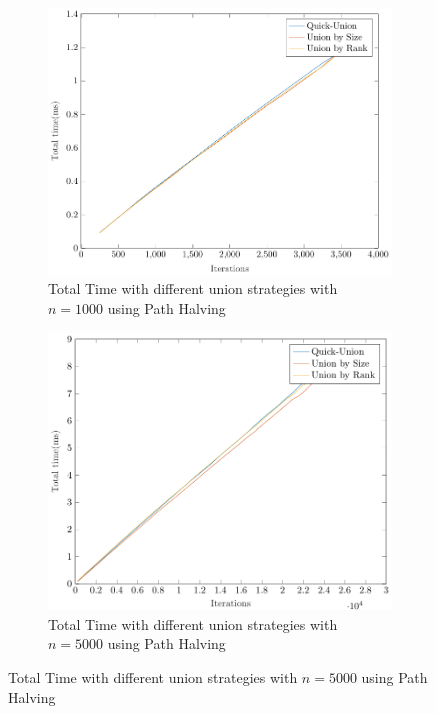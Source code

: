 \begin{figure}[ht]
    \begin{subfigure}{0.32\textwidth}
        \centering
        \includegraphics[width=\textwidth]{../images/plotPHFull1000_time(ms).pdf}
        \caption{Total Time with different union strategies with $n = 1000$ using Path Halving}
    \end{subfigure}%
    \hfill
    \begin{subfigure}{0.32\textwidth}
        \centering
        \includegraphics[width=\textwidth]{../images/plotPHFull5000_time(ms).pdf}
        \caption{Total Time with different union strategies with $n = 5000$ using Path Halving}
    \end{subfigure}%

\end{figure}
